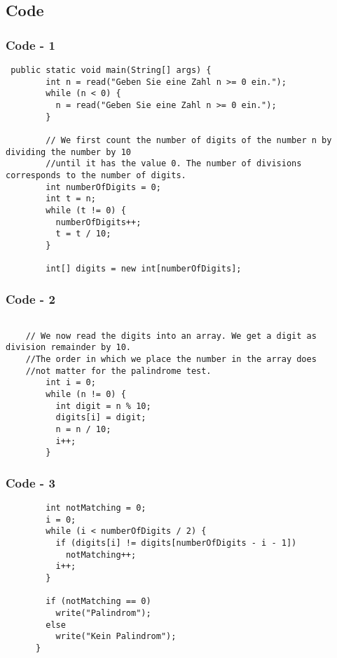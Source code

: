 \documentclass[handout, navsym]{tum-presentation}
\numberwithin{equation}{section}
\begin{document}
\subsection{Code}
\begin{frame}[fragile]
\frametitle{Code - 1}
\vspace*{\fill}
\begin{lstlisting}
 public static void main(String[] args) {
        int n = read("Geben Sie eine Zahl n >= 0 ein.");
        while (n < 0) {
          n = read("Geben Sie eine Zahl n >= 0 ein.");
        }

        // We first count the number of digits of the number n by dividing the number by 10 
        //until it has the value 0. The number of divisions corresponds to the number of digits.
        int numberOfDigits = 0;
        int t = n;
        while (t != 0) {
          numberOfDigits++;
          t = t / 10;
        }

        int[] digits = new int[numberOfDigits];

\end{lstlisting}
\vspace*{\fill}
\end{frame}

\begin{frame}[fragile]
\frametitle{Code - 2}
\vspace*{\fill}
\begin{lstlisting}
	
	// We now read the digits into an array. We get a digit as division remainder by 10.
	//The order in which we place the number in the array does 
	//not matter for the palindrome test.
        int i = 0;
        while (n != 0) {
          int digit = n % 10;
          digits[i] = digit;
          n = n / 10;
          i++;
        }

\end{lstlisting}
\vspace*{\fill}
\end{frame}

\begin{frame}[fragile]
\frametitle{Code - 3}
\vspace*{\fill}
\begin{lstlisting}
        int notMatching = 0;
        i = 0;
        while (i < numberOfDigits / 2) {
          if (digits[i] != digits[numberOfDigits - i - 1])
            notMatching++;
          i++;
        }

        if (notMatching == 0)
          write("Palindrom");
        else
          write("Kein Palindrom");
      }


\end{lstlisting}
\vspace*{\fill}
\end{frame}
\end{document}
